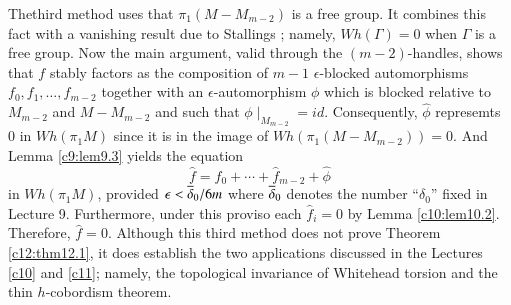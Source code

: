 The\pageoriginale third method uses that $\pi_1 (M- M_{m-2})$ is a
free group. It combines this fact with a vanishing result due to
Stallings \cite{91}; namely, $Wh(\Gamma)=0$ when $\Gamma$ is a free
group. Now the main argument, valid through the $(m-2)$-handles, shows
that $f$ stably factors as the composition of $m-1$ $\epsilon$-blocked
automorphisms $f_0, f_1, \ldots, f_{m-2}$ together with an
$\epsilon$-automor\-phism $\phi$ which is blocked relative to $M_{m-2}$
and $M- M_{m-2}$ and such that $\phi \mid_{M_{m-2}}=
id$. Consequently, $\hat{\phi}$ represemts 0 in $Wh (\pi_1 M)$ since
it is in the image of $Wh(\pi_1 (M - M_{m-2}))=0$. And Lemma
\ref{c9:lem9.3} yields the equation
$$
\hat{f} = \hat{f}_0 + \cdots + \hat{f}_{m-2} + \hat{\phi} 
$$
in $Wh (\pi_1M)$, provided $\epsilon < \overline{\delta}_0 /6m$ where
$\overline{\delta}_0$ denotes the number ``$\delta_0$'' fixed in Lecture
9. Furthermore, under this proviso each $\hat{f}_i=0$ by Lemma
\ref{c10:lem10.2}. Therefore, $\hat{f}=0$. Although this third method
does not prove Theorem \ref{c12:thm12.1}, it does establish the two
applications discussed in the Lectures \ref{c10} and \ref{c11};
namely, the topological invariance of Whitehead torsion and the thin
$h$-cobordism theorem.
